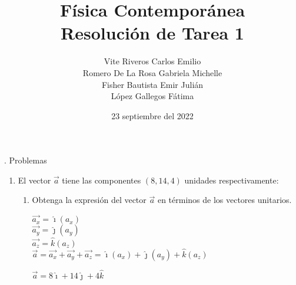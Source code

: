 \documentclass[10pt, a4paper]{article}
\title{Física Contemporánea\\Resolución de Tarea 1}
\author{Vite Riveros Carlos Emilio\\ Romero De La Rosa Gabriela Michelle\\ 
        Fisher Bautista Emir Julián\\ López Gallegos Fátima}
\date{23 septiembre del 2022}
\begin{document}
    . Problemas
    \begin{enumerate}
        \item El vector $\vec{a}$ tiene las componentes $(8, 14, 4)$ unidades respectivamente:
        
        \begin{center}
        \end{center}
        
       \begin{enumerate}
            \item Obtenga la expresión del vector $\vec{a}$ en términos de los vectores unitarios.
            \begin{center}
                $\vec{a_x}= \hat\imath(a_x)$\\
                $\vec{a_y}= \hat\jmath(a_y)$\\
                $\vec{a_z}= \hat{k}(a_z)$\\
                $\vec{a}= \vec{a_x}+\vec{a_y}+\vec{a_z}= \hat\imath(a_x)+\hat\jmath(a_y)+\hat{k}(a_z)$

                $\vec{a}= 8\hat\imath + 14\hat\jmath + 4\hat{k}$
            \end{center}


\end{enumerate}
\end{enumerate}
\end{document}

